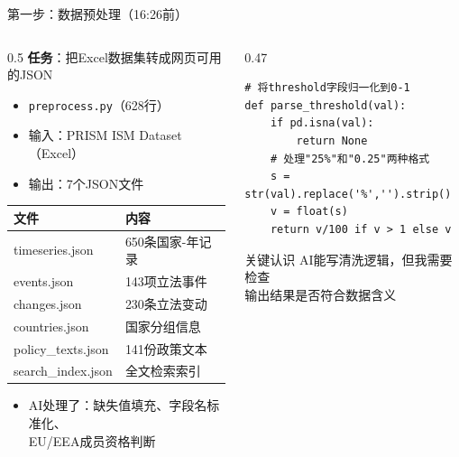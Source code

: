 \documentclass[aspectratio=169,11pt]{beamer}
\begin{document}
\begin{frame}[fragile]{第一步：数据预处理（16:26前）}
  \begin{columns}[T]
    \begin{column}{0.5\linewidth}
      \textbf{任务}：把Excel数据集转成网页可用的JSON\\[0.5em]
      \begin{itemize}
        \item \texttt{preprocess.py}（628行）
        \item 输入：PRISM ISM Dataset（Excel）
        \item 输出：7个JSON文件
      \end{itemize}
      \vspace{0.5em}
      \begin{tabular}{ll}
        \toprule
        \small 文件 & \small 内容 \\
        \midrule
        \small timeseries.json & \small 650条国家-年记录 \\
        \small events.json & \small 143项立法事件 \\
        \small changes.json & \small 230条立法变动 \\
        \small countries.json & \small 国家分组信息 \\
        \small policy\_texts.json & \small 141份政策文本 \\
        \small search\_index.json & \small 全文检索索引 \\
        \bottomrule
      \end{tabular}
      \vspace{0.5em}
      \begin{itemize}
        \item AI处理了：缺失值填充、字段名标准化、\\ EU/EEA成员资格判断
      \end{itemize}
    \end{column}
    \begin{column}{0.47\linewidth}
      \begin{lstlisting}[style=pycode, caption=AI生成的数据清洗片段]
# 将threshold字段归一化到0-1
def parse_threshold(val):
    if pd.isna(val):
        return None
    # 处理"25%"和"0.25"两种格式
    s = str(val).replace('%','').strip()
    v = float(s)
    return v/100 if v > 1 else v
      \end{lstlisting}
      \vspace{0.3em}
      \begin{alertblock}{关键认识}
        AI能写清洗逻辑，但我需要检查\\
        输出结果是否符合数据含义
      \end{alertblock}
    \end{column}
  \end{columns}
\end{frame}
\end{document}
